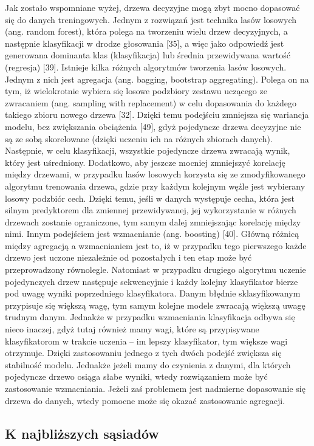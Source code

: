 Jak zostało wspomniane wyżej, drzewa decyzyjne mogą zbyt mocno dopasować się do danych treningowych. Jednym z rozwiązań jest technika lasów losowych (ang. random forest), która polega na tworzeniu wielu drzew decyzyjnych, a następnie klasyfikacji w drodze głosowania [35], a więc jako odpowiedź jest generowana dominanta klas (klasyfikacja) lub średnia przewidywana wartość (regresja) [39]. Istnieje kilka różnych algorytmów tworzenia lasów losowych. Jednym z nich jest agregacja (ang. bagging, bootstrap aggregating). Polega on na tym, iż wielokrotnie wybiera się losowe podzbiory zestawu uczącego ze zwracaniem (ang. sampling with replacement) w celu dopasowania do każdego takiego zbioru nowego drzewa [32]. Dzięki temu podejściu zmniejsza się wariancja modelu, bez zwiększania obciążenia [49], gdyż pojedyncze drzewa decyzyjne nie są ze sobą skorelowane (dzięki uczeniu ich na różnych zbiorach danych). Następnie, w celu klasyfikacji, wszystkie pojedyncze drzewa zwracają wynik, który jest uśredniony. Dodatkowo, aby jeszcze mocniej zmniejszyć korelację między drzewami, w przypadku lasów losowych korzysta się ze zmodyfikowanego algorytmu trenowania drzewa, gdzie przy każdym kolejnym węźle jest wybierany losowy podzbiór cech. Dzięki temu, jeśli w danych występuje cecha, która jest silnym predyktorem dla zmiennej przewidywanej, jej wykorzystanie w różnych drzewach zostanie ograniczone, tym samym dalej zmniejszając korelację między nimi.
Innym podejściem jest wzmacnianie (ang. boosting) [40]. Główną różnicą między agregacją a wzmacnianiem jest to, iż w przypadku tego pierwszego każde drzewo jest uczone niezależnie od pozostałych i ten etap może być przeprowadzony równolegle. Natomiast w przypadku drugiego algorytmu uczenie pojedynczych drzew następuje sekwencyjnie i każdy kolejny klasyfikator bierze pod uwagę wyniki poprzedniego klasyfikatora. Danym błędnie sklasyfikowanym przypisuje się większą wagę, tym samym kolejne modele zwracają większą uwagę trudnym danym. Jednakże w przypadku wzmacniania klasyfikacja odbywa się nieco inaczej, gdyż tutaj również mamy wagi, które są przypisywane klasyfikatorom w trakcie uczenia – im lepszy klasyfikator, tym większe wagi otrzymuje. Dzięki zastosowaniu jednego z tych dwóch podejść zwiększa się stabilność modelu. Jednakże jeżeli mamy do czynienia z danymi, dla których pojedyncze drzewo osiąga słabe wyniki, wtedy rozwiązaniem może być zastosowanie wzmacniania. Jeżeli zaś problemem jest nadmierne dopasowanie się drzewa do danych, wtedy pomocne może się okazać zastosowanie agregacji.


\subsection{K najbliższych sąsiadów}
\label{cha:K najbliższych sąsiadów}

